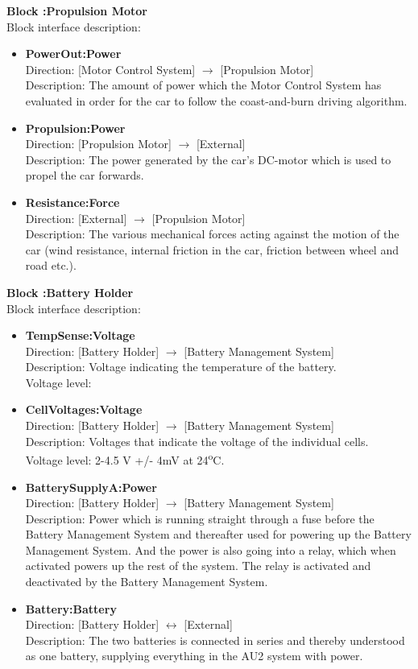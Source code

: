 \textbf{Block :Propulsion Motor}\\
Block interface description:
\begin{itemize}
	\item \textbf{PowerOut:Power}\\
	Direction: [Motor Control System] $\rightarrow$ [Propulsion Motor]\\
	Description: The amount of power which the Motor Control System has evaluated in order for the car to follow the coast-and-burn driving algorithm.
	\item \textbf{Propulsion:Power}\\
	Direction: [Propulsion Motor] $\rightarrow$ [External]\\
	Description: The power generated by the car's DC-motor which is used to propel the car forwards.  
	\item \textbf{Resistance:Force}\\
	Direction: [External] $\rightarrow$ [Propulsion Motor]\\
	Description: The various mechanical forces acting against the motion of the car (wind resistance, internal friction in the car, friction between wheel and road etc.).
\end{itemize}

\textbf{Block :Battery Holder}\\
Block interface description:
\begin{itemize}
	\item \textbf{TempSense:Voltage}\\
	Direction: [Battery Holder] $\rightarrow$ [Battery Management System]\\
	Description: Voltage indicating the temperature of the battery.\\
	Voltage level: 
	\item \textbf{CellVoltages:Voltage}\\
	Direction: [Battery Holder] $\rightarrow$ [Battery Management System]\\
	Description: Voltages that indicate the voltage of the individual cells.\\
	Voltage level: 2-4.5 V +/- 4mV at 24\textsuperscript{o}C\cite{BMSDocumentation}. 
	\item \textbf{BatterySupplyA:Power}\\
	Direction: [Battery Holder] $\rightarrow$ [Battery Management System]\\
	Description: Power which is running straight through a fuse before the Battery Management System and thereafter used for powering up the Battery Management System. And the power is also going into a relay, which when activated powers up the rest of the system. The relay is activated and deactivated by the Battery Management System.
	\item \textbf{Battery:Battery}\\
	Direction: [Battery Holder] $\leftrightarrow$ [External]\\
	Description: The two batteries is connected in series and thereby understood as one battery, supplying everything in the AU2 system with power.
\end{itemize}